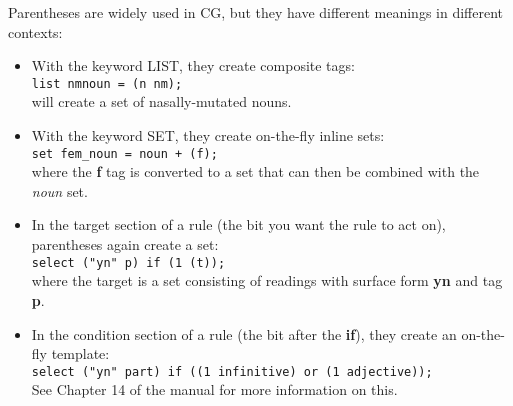 \documentclass[a4paper,10pt]{article}
\begin{document}
Parentheses are widely used in CG, but they have different meanings in different contexts:
\begin{itemize}
\item With the keyword LIST, they create composite tags:\\
\verb|list nmnoun = (n nm);|\\
will create a set of nasally-mutated nouns.
\item With the keyword SET, they create on-the-fly inline sets:\\
\verb|set fem_noun = noun + (f);|\\
where the \textbf{f} tag is converted to a set that can then be combined with the \textit{noun} set.
\item In the target section of a rule (the bit you want the rule to act on), parentheses again create a set:\\
\verb|select ("yn" p) if (1 (t));|\\
where the target is a set consisting of readings with surface form \textbf{yn} and tag \textbf{p}.
\item In the condition section of a rule (the bit after the \textbf{if}), they create an on-the-fly template:\\
\verb|select ("yn" part) if ((1 infinitive) or (1 adjective));|\\
See Chapter 14 of the manual for more information on this.
\end{itemize}
\end{document}
